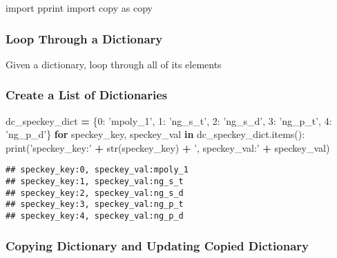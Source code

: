 \documentclass[
]{book}
\newenvironment{Shaded}{\begin{snugshade}}{\end{snugshade}}
\newcommand{\BuiltInTok}[1]{#1}
\newcommand{\ControlFlowTok}[1]{\textcolor[rgb]{0.13,0.29,0.53}{\textbf{#1}}}
\newcommand{\DecValTok}[1]{\textcolor[rgb]{0.00,0.00,0.81}{#1}}
\newcommand{\ImportTok}[1]{#1}
\newcommand{\KeywordTok}[1]{\textcolor[rgb]{0.13,0.29,0.53}{\textbf{#1}}}
\newcommand{\NormalTok}[1]{#1}
\newcommand{\OperatorTok}[1]{\textcolor[rgb]{0.81,0.36,0.00}{\textbf{#1}}}
\newcommand{\StringTok}[1]{\textcolor[rgb]{0.31,0.60,0.02}{#1}}
\begin{document}
\begin{Shaded}
\begin{Highlighting}[]
\ImportTok{import}\NormalTok{ pprint}
\ImportTok{import}\NormalTok{ copy }\ImportTok{as}\NormalTok{ copy}
\end{Highlighting}
\end{Shaded}

\hypertarget{loop-through-a-dictionary}{%
\subsubsection{Loop Through a Dictionary}\label{loop-through-a-dictionary}}

Given a dictionary, loop through all of its elements

\hypertarget{create-a-list-of-dictionaries}{%
\subsubsection{Create a List of Dictionaries}\label{create-a-list-of-dictionaries}}

\begin{Shaded}
\begin{Highlighting}[]
\NormalTok{dc_speckey_dict }\OperatorTok{=}\NormalTok{ \{}\DecValTok{0}\NormalTok{: }\StringTok{'mpoly_1'}\NormalTok{,}
                   \DecValTok{1}\NormalTok{: }\StringTok{'ng_s_t'}\NormalTok{,}
                   \DecValTok{2}\NormalTok{: }\StringTok{'ng_s_d'}\NormalTok{,}
                   \DecValTok{3}\NormalTok{: }\StringTok{'ng_p_t'}\NormalTok{,}
                   \DecValTok{4}\NormalTok{: }\StringTok{'ng_p_d'}\NormalTok{\}}
\ControlFlowTok{for}\NormalTok{ speckey_key, speckey_val }\KeywordTok{in}\NormalTok{ dc_speckey_dict.items():}
    \BuiltInTok{print}\NormalTok{(}\StringTok{'speckey_key:'} \OperatorTok{+} \BuiltInTok{str}\NormalTok{(speckey_key) }\OperatorTok{+} \StringTok{', speckey_val:'} \OperatorTok{+}\NormalTok{ speckey_val)}
\end{Highlighting}
\end{Shaded}

\begin{verbatim}
## speckey_key:0, speckey_val:mpoly_1
## speckey_key:1, speckey_val:ng_s_t
## speckey_key:2, speckey_val:ng_s_d
## speckey_key:3, speckey_val:ng_p_t
## speckey_key:4, speckey_val:ng_p_d
\end{verbatim}

\hypertarget{copying-dictionary-and-updating-copied-dictionary}{%
\subsubsection{Copying Dictionary and Updating Copied Dictionary}\label{copying-dictionary-and-updating-copied-dictionary}}
\end{document}

